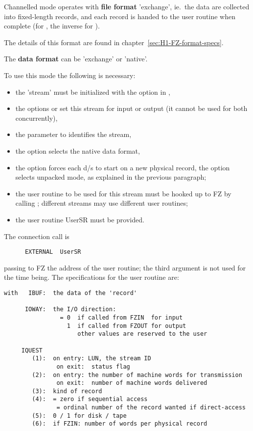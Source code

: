 Channelled mode operates with
\textbf{file format} 'exchange',
ie.~the data are collected into fixed-length records,
and each record is handed to the user routine when complete
(for , the inverse for ).

The details of this format are found in chapter~\ref{sec:H1-FZ-format-specs}.

The \textbf{data format} can be 'exchange' or 'native'.

To use this mode the following is necessary:

\begin{itemize}
\item the 'stream' must be initialized with the  option in ,
\item the options  or  set this stream for input or output
      (it cannot be used for both concurrently),
\item the parameter  to  identifies the stream,
\item the  option selects the native data format,
\item the  option forces each d/s to start on a new
      physical record, the  option selects unpacked mode, as explained
      in the previous paragraph;
\item the user routine  to be used for this stream
      must be hooked up to FZ by calling ;
      different streams may use different user routines;
\item the user routine UserSR must be provided.
\end{itemize}

The connection call is
\begin{verbatim}
      EXTERNAL  UserSR
\end{verbatim}

passing to FZ the address of the user routine;
the third argument is not used for the time being.
The specifications for the user routine are:

\medskip
\colorbox{boxgray}{}
\par\medskip

\begin{verbatim}
with   IBUF:  the data of the 'record'

      IOWAY:  the I/O direction:
                = 0  if called from FZIN  for input
                  1  if called from FZOUT for output
                     other values are reserved to the user

     IQUEST
        (1):  on entry: LUN, the stream ID
               on exit:  status flag
        (2):  on entry: the number of machine words for transmission
               on exit:  number of machine words delivered
        (3):  kind of record
        (4):  = zero if sequential access
               = ordinal number of the record wanted if direct-access
        (5):  0 / 1 for disk / tape
        (6):  if FZIN: number of words per physical record

\end{verbatim}

